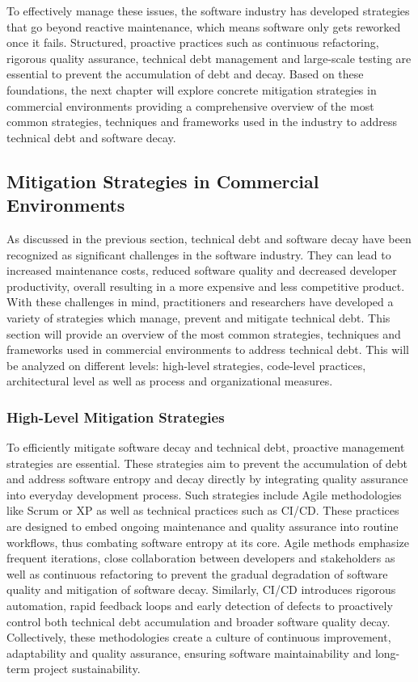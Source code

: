 To effectively manage these issues, the software industry has developed strategies that go beyond reactive maintenance, which means software only gets reworked once it fails. Structured, proactive practices such as continuous refactoring, rigorous quality assurance, technical debt management and large-scale testing are essential to prevent the accumulation of debt and decay.
Based on these foundations, the next chapter will explore concrete mitigation strategies in commercial environments providing a comprehensive overview of the most common strategies, techniques and frameworks used in the industry to address technical debt and software decay.

\subsection{Mitigation Strategies in Commercial Environments}
As discussed in the previous section, technical debt and software decay have been recognized as significant challenges in the software industry. They can lead to 
increased maintenance costs, reduced software quality and decreased developer productivity, overall resulting in a more expensive and less competitive product.
With these challenges in mind, practitioners and researchers have developed a variety of strategies which manage, prevent and mitigate technical debt.
This section will provide an overview of the most common strategies, techniques and frameworks used in commercial environments to address technical debt.
This will be analyzed on different levels: high-level strategies, code-level practices, architectural level as well as process and organizational measures.

\subsubsection{High-Level Mitigation Strategies}
To efficiently mitigate software decay and technical debt, proactive management strategies are essential. These strategies aim to prevent the accumulation of 
debt and address software entropy and decay directly by integrating quality assurance into everyday development process.
Such strategies include Agile methodologies like Scrum or \ac{XP} as well as technical practices
such as \ac{CI/CD}. These practices are designed to embed ongoing maintenance and quality assurance into routine workflows, thus combating software entropy at its core.
Agile methods emphasize frequent iterations, close collaboration between developers and stakeholders as well as continuous refactoring to prevent the
gradual degradation of software quality and mitigation of software decay.
Similarly, \ac{CI/CD} introduces rigorous automation, rapid feedback loops and early detection of defects to proactively control both technical debt accumulation
and broader software quality decay. Collectively, these methodologies create a culture of continuous improvement, adaptability and quality assurance, 
ensuring software maintainability and long-term project sustainability.

